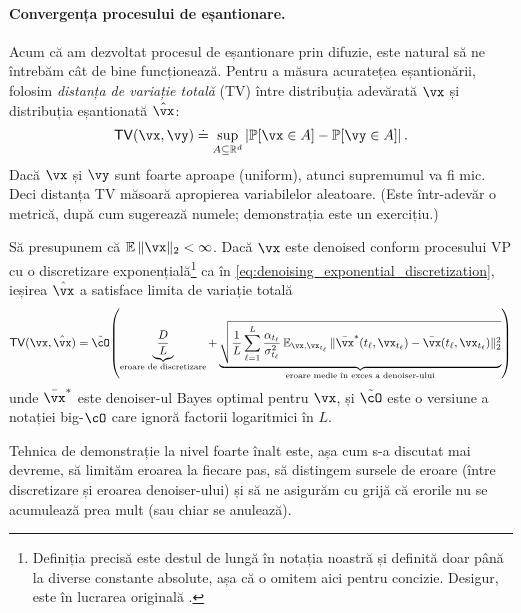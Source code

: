 \documentclass[../../book-main_ro.tex]{subfiles}
\begin{document}
\paragraph{Convergența procesului de eșantionare.} Acum că am dezvoltat procesul de eșantionare prin difuzie, este natural să ne întrebăm cât de bine funcționează. Pentru a măsura acuratețea eșantionării, folosim \textit{distanța de variație totală} (TV) între distribuția adevărată \(\vx\) și distribuția eșantionată \(\hat{\vx}\):
\begin{equation}
	\TV(\vx, \vy) \doteq \sup_{A \subseteq \R^{d}}\abs*{\Pr[\vx \in A] - \Pr[\vy \in A]}.
\end{equation}
Dacă \(\vx\) și \(\vy\) sunt foarte aproape (uniform), atunci supremumul va fi mic. Deci distanța TV măsoară apropierea variabilelor aleatoare. (Este într-adevăr o metrică, după cum sugerează numele; demonstrația este un exercițiu.)

\begin{theorem}\label{thm:diffusion_sampler_convergence}
	Să presupunem că \(\Ex\norm{\vx}_{2} < \infty\). Dacă \(\vx\) este denoised conform procesului VP cu o discretizare exponențială\footnote{Definiția precisă este destul de lungă în notația noastră și definită doar până la diverse constante absolute, așa că o omitem aici pentru concizie. Desigur, este în lucrarea originală \citep{li2024d}.} ca în \eqref{eq:denoising_exponential_discretization}, ieșirea \(\hat{\vx}\) a  satisface limita de variație totală
	\begin{equation}\label{eq:diffusion_sampling_error}
		\TV(\vx, \hat{\vx}) = \tilde{\cO}\rp{\underbrace{\frac{D}{L}}_{\text{eroare de discretizare}} + \underbrace{\sqrt{\frac{1}{L}\sum_{\ell = 1}^{L}\frac{\alpha_{t_{\ell}}}{\sigma_{t_{\ell}}^{2}}\Ex_{\vx, \vx_{t_{\ell}}}\norm{\bar{\vx}^{\ast}(t_{\ell}, \vx_{t_{\ell}}) - \bar{\vx}(t_{\ell}, \vx_{t_{\ell}})}_{2}^{2}}}_{\text{eroare medie în exces a denoiser-ului}}}
	\end{equation}
	unde \(\bar{\vx}^{\ast}\) este denoiser-ul Bayes optimal pentru \(\vx\), și \(\tilde{\cO}\) este o versiune a notației big-\(\cO\) care ignoră factorii logaritmici în \(L\).
\end{theorem}
Tehnica de demonstrație la nivel foarte înalt este, așa cum s-a discutat mai devreme, să limităm eroarea la fiecare pas, să distingem sursele de eroare (între discretizare și eroarea denoiser-ului) și să ne asigurăm cu grijă că erorile nu se acumulează prea mult (sau chiar se anulează).
\end{document}
